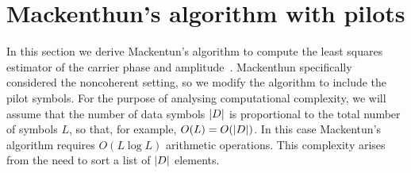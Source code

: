 \documentclass[journal]{IEEEtran}
\begin{document}
\section{Mackenthun's algorithm with pilots}\label{sec:least-squar-estim}

In this section we derive Mackentun's algorithm to compute the least squares estimator of the carrier phase and amplitude~\cite{Mackenthun1994}.  Mackenthun specifically considered the noncoherent setting, so we modify the algorithm to include the pilot symbols.  For the purpose of analysing computational complexity, we will assume that the number of data symbols ${\left\vert D \right\vert}$ is proportional to the total number of symbols $L$, so that, for example, $O(L) = O({\left\vert D \right\vert})$.  In this case Mackentun's algorithm requires $O(L \log L)$ arithmetic operations.  This complexity arises from the need to sort a list of ${\left\vert D \right\vert}$ elements.  

\end{document}
